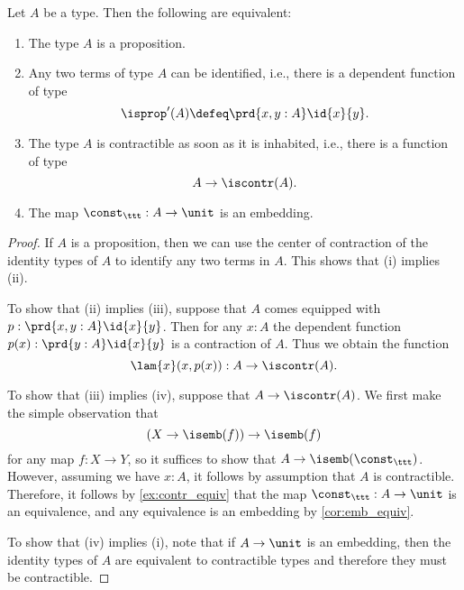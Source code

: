 \begin{prp}\label{lem:isprop_eq}
  Let $A$ be a type. Then the following are equivalent:
  \begin{enumerate}
  \item The type $A$ is a proposition.
  \item Any two terms of type $A$ can be identified, i.e., there is a dependent function of type
    \begin{equation*}
      \isprop'(A)\defeq\prd{x,y:A}\id{x}{y}.
    \end{equation*}
  \item The type $A$ is contractible as soon as it is inhabited, i.e., there is a function of type
    \begin{equation*}
      A \to \iscontr(A).
    \end{equation*}
  \item The map $\const_\ttt : A\to\unit$ is an embedding.
  \end{enumerate}
\end{prp}

\begin{proof}
  If $A$ is a proposition, then we can use the center of contraction of the identity types of $A$ to identify any two terms in $A$. This shows that (i) implies (ii).

  To show that (ii) implies (iii), suppose that $A$ comes equipped with $p:\prd{x,y:A}\id{x}{y}$. Then for any $x:A$ the dependent function $p(x):\prd{y:A}\id{x}{y}$ is a contraction of $A$. Thus we obtain the function
  \begin{equation*}
    \lam{x}(x,p(x)):A\to\iscontr(A).
  \end{equation*}

  To show that (iii) implies (iv), suppose that $A\to\iscontr(A)$. We first make the simple observation that
  \begin{equation*}
    (X\to \isemb(f))\to \isemb(f)
  \end{equation*}
  for any map $f:X\to Y$, so it suffices to show that $A\to\isemb(\const_\ttt)$. However, assuming we have $x:A$, it follows by assumption that $A$ is contractible. Therefore, it follows by \cref{ex:contr_equiv} that the map $\const_\ttt:A\to\unit$ is an equivalence, and any equivalence is an embedding by \cref{cor:emb_equiv}.

  To show that (iv) implies (i), note that if $A\to\unit$ is an embedding, then the identity types of $A$ are equivalent to contractible types and therefore they must be contractible.
\end{proof}

